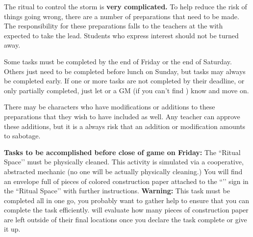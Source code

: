 \documentclass[green]{GL2020}
\begin{document}
\name{\gPreparingTheRitual{}}

The ritual to control the storm is \textbf{very complicated.} To help reduce the risk of things going wrong, there are a number of preparations that need to be made. The responsibility for these preparations falls to the teachers at the \pSchool{} with \cLibrarian{\full} expected to take the lead. Students who express interest should not be turned away.

Some tasks must be completed by the end of Friday or the end of Saturday. Others just need to be completed before lunch on Sunday, but tasks may always be completed early. If one or more tasks are not completed by their deadline, or only partially completed, just let \cPrincipal{\full} or a GM (if you can’t find \cPrincipal{}) know and move on.

There may be characters who have modifications or additions to these preparations that they wish to have included as well. Any teacher can approve these additions, but it is a always risk that an addition or modification amounts to sabotage.

\textbf{Tasks to be accomplished before close of game on Friday:}
The ``Ritual Space’’ must be physically cleaned. This activity is simulated via a cooperative, abstracted mechanic (no one will be actually physically cleaning.) You will find an envelope full of pieces of colored construction paper attached to the ``\sCleaningInstructions{}’’ sign in the ``Ritual Space’’ with further instructions. \textbf{Warning:} This task must be completed all in one go, you probably want to gather help to ensure that you can complete the task efficiently. \cPrincipal{} will evaluate how many pieces of construction paper are left outside of their final locations once you declare the task complete or give it up.
\end{document}
